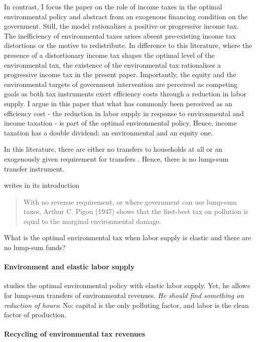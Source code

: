 In contrast, I focus the paper on the role of income taxes in the optimal environmental policy and abstract from an exogenous financing condition on the government. Still, the model rationalizes a positive or progressive income tax.
The inefficiency of environmental taxes arises absent pre-existing income tax distortions or the motive to redistribute.
In difference to this literature, where the presence of a distortionary income tax shapes the optimal level of the environmental tax, the existence of the environmental tax rationalises a progressive income tax in the present paper.
Importantly, the equity and the environmental targets of government intervention are perceived as competing goals as both tax instruments exert efficiency costs through a reduction in labor supply. 
I argue in this paper that what has commonly been perceived as an efficiency cost -  the reduction in labor supply in response to environmental and income taxation - is part of the optimal environmental policy. Hence, income taxation has a double dividend: an environmental and an equity one.  

In this literature, there are either no transfers to households at all \citep{Bovenberg2002EnvironmentalRegulation, LansBovenberg1994EnvironmentalTaxation} or an exogenously given requirement for transfers \citep{Barrage2019OptimalPolicy}. Hence, there is no lump-sum transfer instrument.

\citep{Fullerton1997EnvironmentalComment} writes in its introduction 
\begin{quote}
	With no revenue requirement, or where government can use lump-sum taxes, Arthur C. Pigou (1947) shows that the first-best tax on pollution is equal to the marginal environmental damage.
\end{quote}
\ar What is the optimal environmental tax when labor supply is elastic and there are no lump-sum funds?
\paragraph{Environment and elastic labor supply}
\cite{Oueslati2002EnvironmentalSupply} studies the optimal environmental policy with elastic labor supply. Yet, he allows for lump-sum transfers of environmental revenues. \textit{He should find something on reduction of hours}: No: capital is the only polluting factor, and labor is the clean factor of production.
\paragraph{Recycling of environmental tax revenues}
\cite{Fried2018TheGenerations}
